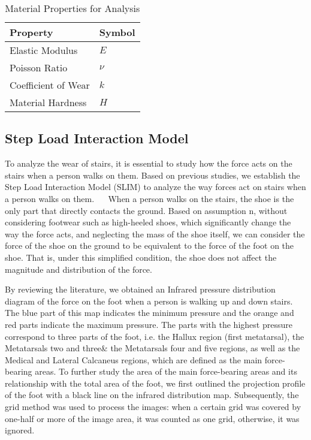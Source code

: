 \documentclass{mcmthesis}
\begin{document}
\begin{table}[h!] 

\centering 

\caption{Material Properties for Analysis} 

\label{tab:material_properties} 

\begin{tabular}{@{}ll@{}} 

\toprule 

\textbf{Property} & \textbf{Symbol} \\ 

\midrule 

Elastic Modulus & \( E \) \\ 

Poisson Ratio & \( \nu \) \\ 

Coefficient of Wear & \( k \) \\ 

Material Hardness & \( H \) \\ 

\bottomrule 

\end{tabular}
\end{table}

\subsection{Step Load Interaction Model}
To analyze the wear of stairs, it is essential to study how the force acts on the stairs when a person walks on them. Based on previous studies, we establish the Step Load Interaction Model (SLIM) to analyze the way forces act on stairs when a person walks on them. 
 
When a person walks on the stairs, the shoe is the only part that directly contacts the ground. Based on assumption n, without considering footwear such as high-heeled shoes, which significantly change the way the force acts, and neglecting the mass of the shoe itself, we can consider the force of the shoe on the ground to be equivalent to the force of the foot on the shoe. That is, under this simplified condition, the shoe does not affect the magnitude and distribution of the force.  

By reviewing the literature, we obtained an Infrared pressure distribution diagram of the force on the foot when a person is walking up and down stairs\cite{YISX202303023}. The blue part of this map indicates the minimum pressure and the orange and red parts indicate the maximum pressure. The parts with the highest pressure correspond to three parts of the foot, i.e. the Hallux region (first metatarsal), the Metatarsals two and three\& the Metatarsals four and five regions, as well as the Medical and Lateral Calcaneus regions, which are defined as the main force-bearing areas. To further study the area of the main force-bearing areas and its relationship with the total area of the foot, we first outlined the projection profile of the foot with a black line on the infrared distribution map. Subsequently, the grid method was used to process the images: when a certain grid was covered by one-half or more of the image area, it was counted as one grid, otherwise, it was ignored.  
\end{document}
